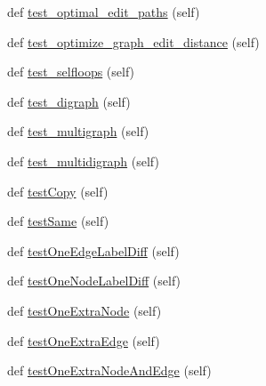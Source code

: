 \begin{DoxyCompactItemize}
\item 
def \hyperlink{classnetworkx_1_1algorithms_1_1tests_1_1test__similarity_1_1TestSimilarity_aea1b0b3fe96a048201db9032dcd22d9f}{test\+\_\+optimal\+\_\+edit\+\_\+paths} (self)
\item 
def \hyperlink{classnetworkx_1_1algorithms_1_1tests_1_1test__similarity_1_1TestSimilarity_a4aae40695829873ef323a89afb97cf03}{test\+\_\+optimize\+\_\+graph\+\_\+edit\+\_\+distance} (self)
\item 
def \hyperlink{classnetworkx_1_1algorithms_1_1tests_1_1test__similarity_1_1TestSimilarity_a598e8fea92f36cca828625e4d9c13730}{test\+\_\+selfloops} (self)
\item 
def \hyperlink{classnetworkx_1_1algorithms_1_1tests_1_1test__similarity_1_1TestSimilarity_a840a16610e8f4cfb62c44b5fe63bf05b}{test\+\_\+digraph} (self)
\item 
def \hyperlink{classnetworkx_1_1algorithms_1_1tests_1_1test__similarity_1_1TestSimilarity_a534788a58567813121ac27f7702a6fd2}{test\+\_\+multigraph} (self)
\item 
def \hyperlink{classnetworkx_1_1algorithms_1_1tests_1_1test__similarity_1_1TestSimilarity_a94e99846169928535c399d8ff11c0db0}{test\+\_\+multidigraph} (self)
\item 
def \hyperlink{classnetworkx_1_1algorithms_1_1tests_1_1test__similarity_1_1TestSimilarity_af9ae5d09a06a4a6f9b9eb70d9d414857}{test\+Copy} (self)
\item 
def \hyperlink{classnetworkx_1_1algorithms_1_1tests_1_1test__similarity_1_1TestSimilarity_ad76fb75f8a60bcd00eeb205919bb22fd}{test\+Same} (self)
\item 
def \hyperlink{classnetworkx_1_1algorithms_1_1tests_1_1test__similarity_1_1TestSimilarity_ab9696192e9ecb92976cc87130512b299}{test\+One\+Edge\+Label\+Diff} (self)
\item 
def \hyperlink{classnetworkx_1_1algorithms_1_1tests_1_1test__similarity_1_1TestSimilarity_aeeb11bd3a5fd6cf04ae5c11092b1fe61}{test\+One\+Node\+Label\+Diff} (self)
\item 
def \hyperlink{classnetworkx_1_1algorithms_1_1tests_1_1test__similarity_1_1TestSimilarity_af44e345c983a559721022b6e81569ff7}{test\+One\+Extra\+Node} (self)
\item 
def \hyperlink{classnetworkx_1_1algorithms_1_1tests_1_1test__similarity_1_1TestSimilarity_ad0c740cec592216d04dc552fc87b188a}{test\+One\+Extra\+Edge} (self)
\item 
def \hyperlink{classnetworkx_1_1algorithms_1_1tests_1_1test__similarity_1_1TestSimilarity_ac4b59dae579ca88af937e9237bc8fc8b}{test\+One\+Extra\+Node\+And\+Edge} (self)

\end{DoxyCompactItemize}
